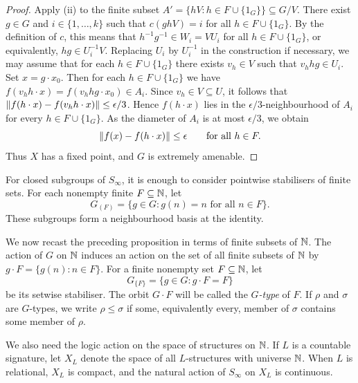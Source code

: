 \begin{proof}
    Apply (ii) to the finite subset \(A'=\{hV : h\in F\cup\{1_G\}\}\subseteq G/V\). There exist \(g\in G\) and \(i\in\{1,\dots,k\}\) such that \(c(ghV)=i\) for all \(h\in F\cup\{1_G\}\). By the definition of \(c\), this means that \(h^{-1}g^{-1}\in W_i=V U_i\) for all \(h\in F\cup\{1_G\}\), or equivalently, \(hg\in U_i^{-1}V\).
    Replacing \(U_i\) by \(U_i^{-1}\) in the construction if necessary, we may assume that for each \(h\in F\cup\{1_G\}\) there exists \(v_h\in V\) such that \(v_h h g \in U_i\). Set \(x=g\cdot x_0\). Then for each \(h\in F\cup\{1_G\}\) we have \(f(v_h h\cdot x)=f(v_h h g\cdot x_0)\in A_i\). Since \(v_h\in V\subseteq U\), it follows that \(\left\lVert f(h\cdot x)-f(v_h h\cdot x)\right\rVert\leq \epsilon/3\).
    Hence \(f(h\cdot x)\) lies in the \(\epsilon/3\)-neighbourhood of \(A_i\) for every \(h\in F\cup\{1_G\}\). As the diameter of \(A_i\) is at most \(\epsilon/3\), we obtain
    \[
        \left\lVert f(x)-f(h\cdot x)\right\rVert\leq \epsilon
        \qquad\text{for all } h\in F.
    \]
    Thus \(X\) has a fixed point, and \(G\) is extremely amenable.
\end{proof}

For closed subgroups of \(S_\infty\), it is enough to consider pointwise stabilisers of finite sets. For each nonempty finite \(F\subseteq \mathbb{N}\), let
\[
    G_{(F)}=\{g\in G : g(n)=n \text{ for all } n\in F\}.
\]
These subgroups form a neighbourhood basis at the identity.

We now recast the preceding proposition in terms of finite subsets of \(\mathbb{N}\). The action of \(G\) on \(\mathbb{N}\) induces an action on the set of all finite subsets of \(\mathbb{N}\) by \(g\cdot F=\{g(n): n\in F\}\).
For a finite nonempty set \(F\subseteq\mathbb{N}\), let
\[
    G_{\{F\}}=\{g\in G : g\cdot F=F\}
\]
be its setwise stabiliser. The orbit \(G\cdot F\) will be called the \emph{\(G\)-type} of \(F\). If \(\rho\) and \(\sigma\) are \(G\)-types, we write \(\rho\leq \sigma\) if some, equivalently every, member of \(\sigma\) contains some member of \(\rho\).

We also need the logic action on the space of structures on \(\mathbb{N}\). If \(L\) is a countable signature, let \(X_L\) denote the space of all \(L\)-structures with universe \(\mathbb{N}\). When \(L\) is relational, \(X_L\) is compact, and the natural action of \(S_\infty\) on \(X_L\) is continuous.

